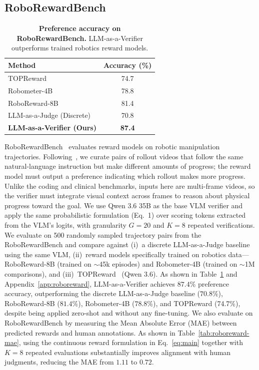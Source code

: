 \subsection{RoboRewardBench}
\label{sec:roboreward}

\begin{table}
\vspace{-\baselineskip}
\centering
\caption{\textbf{Preference accuracy on RoboRewardBench.} LLM-as-a-Verifier outperforms trained robotics reward models.}
\label{tab:roboreward}
\small
\setlength{\tabcolsep}{6pt}
\begin{tabular}{lc}
\toprule
Method & Accuracy (\%) \\
\midrule
TOPReward                  & 74.7 \\
Robometer-4B               & 78.8 \\
RoboReward-8B              & 81.4 \\
LLM-as-a-Judge (Discrete)  & 70.8 \\
\textbf{LLM-as-a-Verifier (Ours)} & \textbf{87.4} \\
\bottomrule
\end{tabular}
\vspace{-\baselineskip}
\end{table}

RoboRewardBench~\citep{lee2026roboreward} evaluates reward models on robotic manipulation trajectories. Following~\citet{liang2026robometer}, we curate pairs of rollout videos that follow the same natural-language instruction but make different amounts of progress; the reward model must output a preference indicating which rollout makes more progress. Unlike the coding and clinical benchmarks, inputs here are multi-frame videos, so the verifier must integrate visual context across frames to reason about physical progress toward the goal. We use Qwen 3.6 35B as the base VLM verifier and apply the same probabilistic formulation (Eq.~1) over scoring tokens extracted from the VLM's logits, with granularity $G{=}20$ and $K{=}8$ repeated verifications. We evaluate on 500 randomly sampled trajectory pairs from the RoboRewardBench and compare against (i)~a discrete LLM-as-a-Judge baseline using the same VLM, (ii)~reward models specifically trained on robotics data---RoboReward-8B (trained on $\sim$45k episodes) and Robometer-4B (trained on $\sim$1M comparisons), and (iii)~TOPReward~\cite{chen2026topreward} (Qwen 3.6). As shown in Table~\ref{tab:roboreward} and Appendix~\ref{app:roboreward}, LLM-as-a-Verifier achieves $\mathbf{87.4\%}$ preference accuracy, outperforming the discrete LLM-as-a-Judge baseline ($70.8\%$), RoboReward-8B ($81.4\%$), Robometer-4B \cite{liang2026robometer} ($78.8\%$), and TOPReward (74.7\%), despite being applied zero-shot and without any fine-tuning. We also evaluate on RoboRewardBench by measuring the Mean Absolute Error (MAE) between predicted rewards and human annotations. As shown in Table~\ref{tab:roboreward-mae}, using the continuous reward formulation in Eq.~\ref{eq:main} together with $K{=}8$ repeated evaluations substantially improves alignment with human judgments, reducing the MAE from $1.11$ to $\mathbf{0.72}$.

